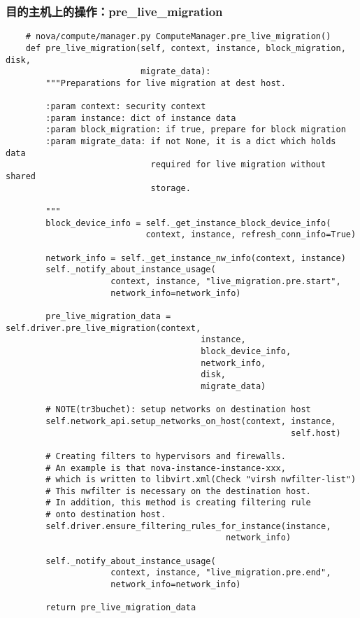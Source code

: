 \documentclass[a4paper,left=1.5cm,right=1.5cm,11pt]{article}
\begin{document}
\subsubsection{目的主机上的操作：pre\_live\_migration}
    \begin{lstlisting}
    # nova/compute/manager.py ComputeManager.pre_live_migration()
    def pre_live_migration(self, context, instance, block_migration, disk,
                           migrate_data):
        """Preparations for live migration at dest host.

        :param context: security context
        :param instance: dict of instance data
        :param block_migration: if true, prepare for block migration
        :param migrate_data: if not None, it is a dict which holds data
                             required for live migration without shared
                             storage.

        """
        block_device_info = self._get_instance_block_device_info(
                            context, instance, refresh_conn_info=True)

        network_info = self._get_instance_nw_info(context, instance)
        self._notify_about_instance_usage(
                     context, instance, "live_migration.pre.start",
                     network_info=network_info)

        pre_live_migration_data = self.driver.pre_live_migration(context,
                                       instance,
                                       block_device_info,
                                       network_info,
                                       disk,
                                       migrate_data)

        # NOTE(tr3buchet): setup networks on destination host
        self.network_api.setup_networks_on_host(context, instance,
                                                         self.host)

        # Creating filters to hypervisors and firewalls.
        # An example is that nova-instance-instance-xxx,
        # which is written to libvirt.xml(Check "virsh nwfilter-list")
        # This nwfilter is necessary on the destination host.
        # In addition, this method is creating filtering rule
        # onto destination host.
        self.driver.ensure_filtering_rules_for_instance(instance,
                                            network_info)

        self._notify_about_instance_usage(
                     context, instance, "live_migration.pre.end",
                     network_info=network_info)

        return pre_live_migration_data
    \end{lstlisting}
\end{document}
